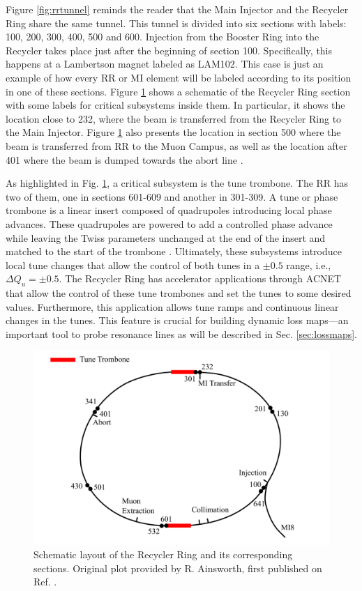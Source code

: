 Figure \ref{fig:rrtunnel} reminds the reader that the Main Injector and the Recycler Ring share the same tunnel. This tunnel is divided into six sections with labels: 100, 200, 300, 400, 500 and 600. Injection from the Booster Ring into the Recycler takes place just after the beginning of section 100. Specifically, this happens at a Lambertson magnet labeled as LAM102. This case is just an example of how every RR or MI element will be labeled according to its position in one of these sections. Figure \ref{fig:rrschematic} shows a schematic of the Recycler Ring section with some labels for critical subsystems inside them. In particular, it shows the location close to 232, where the beam is transferred from the Recycler Ring to the Main Injector. Figure \ref{fig:rrschematic} also presents the location in section 500 where the beam is transferred from RR to the Muon Campus, as well as the location after 401 where the beam is dumped towards the abort line \cite{rr1,fermi_rookie}.

As highlighted in Fig. \ref{fig:rrschematic}, a critical subsystem is the tune trombone. The RR has two of them, one in sections 601-609 and another in 301-309. A tune or phase trombone is a linear insert composed of quadrupoles introducing local phase advances. These quadrupoles are powered to add a controlled phase advance while leaving the Twiss parameters unchanged at the end of the insert and matched to the start of the trombone \cite{trombone,rr0}. Ultimately, these subsystems introduce local tune changes that allow the control of both tunes in a $\pm 0.5$ range, i.e., $\Delta Q_u = \pm 0.5$. The Recycler Ring has accelerator applications through ACNET that allow the control of these tune trombones and set the tunes to some desired values. Furthermore, this application allows tune ramps and continuous linear changes in the tunes. This feature is crucial for building dynamic loss maps---an important tool to probe resonance lines as will be described in Sec. \ref{sec:lossmaps}.    

\begin{figure}[H]
   \centering
   \includegraphics[width=\columnwidth]{chapter3/RRschematic.png}
   \caption{Schematic layout of the Recycler Ring and its corresponding sections. Original plot provided by R. Ainsworth, first published on Ref. \cite{rr1}.}
   \label{fig:rrschematic}
\end{figure}

